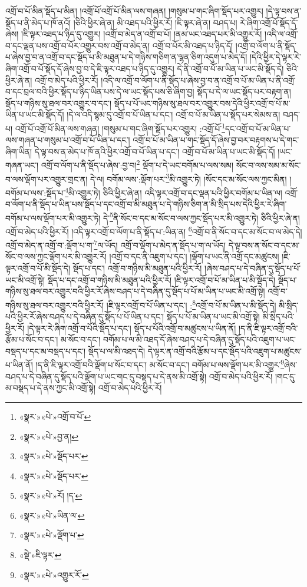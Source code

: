འགྲོ་བ་པོ་མིན་སྡོད་པ་མིན། །འགྲོ་པོ་འགྲོ་པོ་མིན་ལས་གཞན། །གསུམ་པ་གང་ཞིག་སྡོད་པར་འགྱུར། །དེ་ལྟ་བས་ན་སྡོད་པ་ནི་མེད་པ་ཁོ་ནའོ། །ཅིའི་ཕྱིར་ཞེ་ན། མི་འཐད་པའི་ཕྱིར་རོ། །ཇི་ལྟར་ཞེ་ན། བཤད་པ། རེ་ཞིག་འགྲོ་པོ་སྡོད་དོ་ཞེས། །ཇི་ལྟར་འཐད་པ་ཉིད་དུ་འགྱུར། །འགྲོ་བ་མེད་ན་འགྲོ་བ་པོ། །ནམ་ཡང་འཐད་པར་མི་འགྱུར་རོ། །འདི་ལ་འགྲོ་བ་དང་ལྡན་པས་འགྲོ་བ་པོར་འགྱུར་བས་འགྲོ་བ་མེད་ན། འགྲོ་བ་པོར་མི་འཐད་པ་ཉིད་དོ། །འགྲོ་བ་ལོག་པ་ནི་སྡོད་པ་ཞེས་བྱ་བ་ན་འགྲོ་བ་དང་སྡོད་པ་མི་མཐུན་པ་དེ་གཉིས་གཅིག་ན་ལྷན་ཅིག་འདུག་པ་མེད་དོ། །དེའི་ཕྱིར་དེ་ལྟར་རེ་ཞིག་འགྲོ་བ་པོ་སྡོད་དོ་ཞེས་བྱ་བ་དེ་ཇི་ལྟར་འཐད་པ་ཉིད་དུ་འགྱུར། དེ་ནི་འགྲོ་བ་པོ་མ་ཡིན་པ་ཡང་མི་སྡོད་དེ། ཅིའི་ཕྱིར་ཞེ་ན། འགྲོ་བ་མེད་པའི་ཕྱིར་རོ། །འདི་ལ་འགྲོ་བ་ལོག་པ་ནི་སྡོད་པ་ཞེས་བྱ་བ་ན་འགྲོ་བ་པོ་མ་ཡིན་པ་ནི་འགྲོ་བ་དང་བྲལ་བའི་ཕྱིར་སྡོད་པ་ཉིད་ཡིན་པས་དེ་ལ་ཡང་སྡོད་པས་ཅི་ཞིག་བྱ། སྡོད་པ་དེ་ལ་ཡང་སྡོད་པར་བརྟག་ན། སྡོད་པ་གཉིས་སུ་ཐལ་བར་འགྱུར་བ་དང་། སྡོད་པ་པོ་ཡང་གཉིས་སུ་ཐལ་བར་འགྱུར་བས་དེའི་ཕྱིར་འགྲོ་བ་པོ་མ་ཡིན་པ་ཡང་མི་སྡོད་དོ། །དེ་ལ་འདི་སྙམ་དུ་འགྲོ་བ་པོ་ཡིན་པ་དང་། འགྲོ་བ་པོ་མ་ཡིན་པ་སྡོད་པར་སེམས་ན། བཤད་པ། འགྲོ་པོ་འགྲོ་པོ་མིན་ལས་གཞན། །གསུམ་པ་གང་ཞིག་སྡོད་པར་འགྱུར། :འགྲོ་པོ་\footnote{«སྣར་»«པེ་»འགྲོ་བ་པོ་}དང་འགྲོ་བ་པོ་མ་ཡིན་པ་ལས་གཞན་པ་གསུམ་པ་འགྲོ་བ་པོ་ཡིན་པ་དང་། འགྲོ་བ་པོ་མ་ཡིན་པ་གང་སྡོད་དོ་ཞེས་བྱ་བར་བརྟགས་པ་དེ་གང་ཞིག་ཡིན། དེ་ལྟ་བས་ན་མེད་པ་ཁོ་ནའི་ཕྱིར་འགྲོ་བ་པོ་ཡིན་པ་དང་། འགྲོ་བ་པོ་མ་ཡིན་པ་ཡང་མི་སྡོད་དོ། །ཡང་གཞན་ཡང་། འགྲོ་བ་ལོག་པ་ནི་སྡོད་པ་ཞེས་:བྱ་བ།\footnote{«སྣར་»«པེ་»བྱ་ན།} ལྡོག་པ་དེ་ཡང་བགོམ་པ་ལས་སམ། སོང་བ་ལས་སམ་མ་སོང་བ་ལས་ལྡོག་པར་འགྱུར་གྲང་ན། དེ་ལ། བགོམ་ལས་:ལྡོག་པར་\footnote{«སྣར་»«པེ་»སྡོད་པར་}མི་འགྱུར་ཏེ། །སོང་དང་མ་སོང་ལས་ཀྱང་མིན། །བགོམ་པ་ལས་:སྡོད་པ་\footnote{«སྣར་»«པེ་»སྡོད་པར་}མི་འགྱུར་ཏེ། ཅིའི་ཕྱིར་ཞེ་ན། འདི་ལྟར་འགྲོ་བ་དང་ལྡན་པའི་ཕྱིར་བགོམ་པ་ཡིན་ལ། འགྲོ་བ་ལོག་པ་ནི་སྡོད་པ་ཡིན་པས་སྡོད་པ་དང་འགྲོ་བ་མི་མཐུན་པ་དེ་གཉིས་ཅིག་ན་མི་སྲིད་པས་དེའི་ཕྱིར་རེ་ཞིག་བགོམ་པ་ལས་ལྡོག་པར་མི་འགྱུར་ཏེ། དེ་\footnote{«སྣར་»«པེ་»རོ། །ད་}ནི་སོང་བ་དང་མ་སོང་བ་ལས་ཀྱང་སྡོད་པར་མི་འགྱུར་ཏེ། ཅིའི་ཕྱིར་ཞེ་ན། འགྲོ་བ་མེད་པའི་ཕྱིར་རོ། །འདི་ལྟར་འགྲོ་བ་ལོག་པ་ནི་སྡོད་པ་:ཡིན་ན། \footnote{«སྣར་»«པེ་»ཡིན་ལ་}འགྲོ་བ་ནི་སོང་བ་དང་མ་སོང་བ་ལ་མེད་དེ། འགྲོ་བ་མེད་ན་འགྲོ་བ་:ལྡོག་པ་ག་\footnote{«སྣར་»«པེ་»ལྡོག་པ་}ལ་ཡོད། འགྲོ་བ་ལྡོག་པ་མེད་ན་སྡོད་པ་ག་ལ་ཡོད། དེ་ལྟ་བས་ན་སོང་བ་དང་མ་སོང་བ་ལས་ཀྱང་ལྡོག་པར་མི་འགྱུར་རོ། །འགྲོ་བ་དང་ནི་འཇུག་པ་དང་། །ལྡོག་པ་ཡང་ནི་འགྲོ་དང་མཚུངས། །ཇི་ལྟར་འགྲོ་བ་པོ་མི་སྡོད་དེ། སྡོད་པ་དང་། འགྲོ་བ་གཉིས་མི་མཐུན་པའི་ཕྱིར་རོ། །ཞེས་བཤད་པ་དེ་བཞིན་དུ་སྡོད་པ་པོ་ཡང་མི་འགྲོ་སྟེ། སྡོད་པ་དང་འགྲོ་བ་གཉིས་མི་མཐུན་པའི་ཕྱིར་རོ། །ཇི་ལྟར་འགྲོ་བ་པོ་མ་ཡིན་པ་མི་སྡོད་དེ། སྡོད་པ་གཉིས་སུ་ཐལ་བར་འགྱུར་བའི་ཕྱིར་རོ་ཞེས་བཤད་པ་དེ་བཞིན་དུ་སྡོད་པ་པོ་མ་ཡིན་པ་ཡང་མི་འགྲོ་སྟེ། འགྲོ་བ་གཉིས་སུ་ཐལ་བར་འགྱུར་བའི་ཕྱིར་རོ། །ཇི་ལྟར་འགྲོ་བ་པོ་ཡིན་པ་དང་། :\footnote{«སྡེ་»ཇི་ལྟར་}འགྲོ་བ་པོ་མ་ཡིན་པ་མི་སྡོད་དེ། མི་སྲིད་པའི་ཕྱིར་རོ་ཞེས་བཤད་པ་དེ་བཞིན་དུ་སྡོད་པ་པོ་ཡིན་པ་དང་། སྡོད་པ་པོ་མ་ཡིན་པ་ཡང་མི་འགྲོ་སྟེ། མི་སྲིད་པའི་ཕྱིར་རོ། །དེ་ལྟར་རེ་ཞིག་འགྲོ་བ་པོའི་སྡོད་པ་དང་། སྡོད་པ་པོའི་འགྲོ་བ་མཚུངས་པ་ཡིན་ནོ། །ད་ནི་ཇི་ལྟར་འགྲོ་བའི་རྩོམ་པ་སོང་བ་དང་། མ་སོང་བ་དང་། བགོམ་པ་ལ་མི་འཐད་དོ་ཞེས་བཤད་པ་དེ་བཞིན་དུ་སྡོད་པའི་འཇུག་པ་ཡང་བསྡད་པ་དང་མ་བསྡད་པ་དང་། སྡོད་པ་ལ་མི་འཐད་དེ། དེ་ལྟར་ན་འགྲོ་བའི་རྩོམ་པ་དང་སྡོད་པའི་འཇུག་པ་མཚུངས་པ་ཡིན་ནོ། །ད་ནི་ཇི་ལྟར་འགྲོ་བའི་ལྡོག་པ་སོང་བ་དང་། མ་སོང་བ་དང་། བགོམ་པ་ལས་ལྡོག་པར་མི་འགྱུར་\footnote{«སྣར་»«པེ་»འགྱུར་རོ་}ཞེས་བཤད་པ་དེ་བཞིན་དུ་སྡོད་པའི་ལྡོག་པ་ཡང་གང་དུ་བསྡད་པ་དེ་ནས་མི་འགྲོ་སྟེ། འགྲོ་བ་མེད་པའི་ཕྱིར་རོ། །གང་དུ་མ་བསྡད་པ་དེ་ནས་ཀྱང་མི་འགྲོ་སྟེ། འགྲོ་བ་མེད་པའི་ཕྱིར་རོ། 